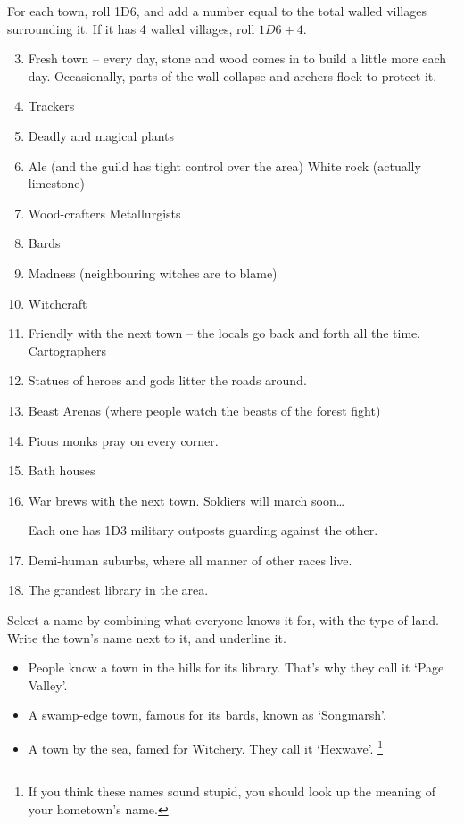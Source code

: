 \begin{multicols}{2}
For each town, roll 1D6, and add a number equal to the total walled villages surrounding it.
If it has 4 walled villages, roll $1D6+4$.

\begin{multicols}{2}

\begin{enumerate}
\setcounter{enumi}{2}
\item
  Fresh town -- every day, stone and wood comes in to build a little more each day.
  Occasionally, parts of the wall collapse and archers flock to protect it.
\item
  Trackers
\item
  Deadly and magical plants
\item
  \ifodd\value{r4}
    Ale (and the guild has tight control over the area)
  \else
    White rock (actually limestone)
  \fi
\item
  \ifodd\value{r4}
    Wood-crafters
  \else
    Metallurgists
  \fi
\item
 Bards
\item
  Madness (neighbouring witches are to blame)
\item
  Witchcraft
\item
  \ifodd\value{r4}
  Friendly with the next town -- the locals go back and forth all the
    time.
  \else
    Cartographers
  \fi
\item
  Statues of heroes and gods litter the roads around.
\item
  Beast Arenas (where people watch the beasts of the forest fight)
\item
  Pious monks pray on every corner.
\item
  Bath houses
\item
  War brews with the next town.
  Soldiers will march soon\ldots

  Each one has 1D3 military outposts guarding against the other.
\item
  Demi-human suburbs, where all manner of other races live.
\item
  The grandest library in the area.
\end{enumerate}

\end{multicols}


Select a name by combining what everyone knows it for, with the type of
land.
Write the town's name next to it, and underline it.

\begin{itemize}
\item
  People know a town in the hills for its library. That's why they call
  it `Page Valley'.
\item
  A swamp-edge town, famous for its bards, known as `Songmarsh'.
\item
  A town by the sea, famed for Witchery.
  They call it `Hexwave'.%
  \footnote{If you think these names sound stupid, you should look up the meaning of your hometown's name.}
\end{itemize}


\end{multicols}
